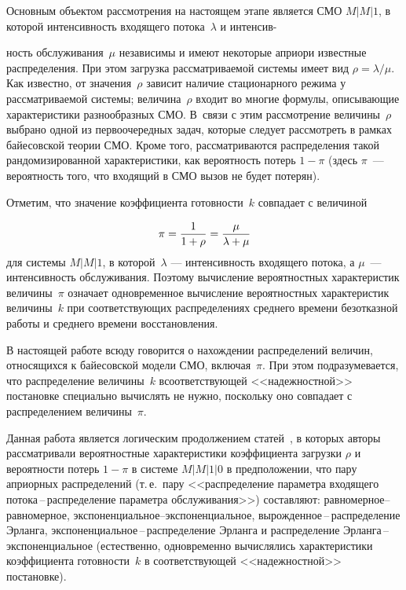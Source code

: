 \begin{multicols}{2}
Основным объектом рассмотрения на настоящем этапе является СМО
$M\vert M\vert 1$, в которой интенсивность входящего
потока~$\lambda$ и интенсив-\linebreak\vspace*{-12pt}
\pagebreak

\noindent
ность обслуживания~$\mu$ независимы и
имеют некоторые априори известные распределения. При этом загрузка
рассматриваемой системы имеет вид $\rho=\lambda/\mu$. Как
известно, от значения~$\rho$ зависит наличие стационарного режима
у рассматриваемой сис\-те\-мы; величина~$\rho$ входит во многие
формулы, описывающие характеристики разнообразных СМО. В~связи с
этим рассмотрение величины~$\rho$ выбрано одной из первоочередных
задач, которые следует рассмотреть в рамках байесовской теории
СМО. Кроме того, рассматриваются распределения такой
рандомизированной характеристики, как вероятность потерь $1-\pi$
(здесь $\pi$~--- вероятность того, что входящий в СМО вызов не
будет потерян).

Отметим, что значение коэффициента го\-тов\-ности~$k$ совпадает с величиной
\vspace*{2pt}

\noindent
$$
\pi=\displaystyle\frac{\displaystyle 1\mathstrut}{\displaystyle 1+\rho\mathstrut}=\displaystyle\frac{\displaystyle \mu\mathstrut}{\displaystyle \lambda+\mu\mathstrut}
$$
для системы $M\vert M\vert 1$, в которой~$\lambda$ --- интенсивность входящего потока, а  
$\mu$~--- интенсивность обслуживания.
Поэтому вычисление вероятностных характеристик величины~$\pi$ означает одновременное вычисление вероятностных
характеристик величины~$k$ при соответствующих распределениях среднего времени безотказной работы и среднего времени
восстановления.

В настоящей работе всюду говорится о на\-хож\-де\-нии распределений величин, относящихся к байесовской модели СМО, 
включая~$\pi$. При этом подразумевается, что распределение величины~$k$ в\linebreak соответствующей <<надежностной>> постановке
специально вычислять не нужно, поскольку оно совпадает с распределением величины~$\pi$.

Данная работа является логическим продолжением статей~\cite{1kud, 2kud, 4kud}, в которых авторы рас\-смат\-ри\-ва\-ли вероятностные
характеристики коэффициента загрузки $\rho$ и вероятности потерь $1-\pi$ в\linebreak
сис\-теме $M\vert M\vert 1\vert 0$ в предположении, что пару\linebreak
априорных распределений (т.\,е.\ пару <<распределение параметра входящего по\-то\-ка\,--\,рас\-пре\-де\-ле\-ние 
па\-ра\-мет\-ра
обслуживания>>) составляют:  рав\-но\-мер\-ное--рав\-но\-мер\-ное, 
экспо\-нен\-ци\-аль\-ное--экс\-по\-нен\-ци\-аль\-ное, вы\-рож\-ден\-ное\,--\,распределение 
Эрланга, экс\-по\-нен\-ци\-аль\-ное\,--\,рас\-пре\-де\-ле\-ние Эрланга и распределение Эрланга\,--\,экспоненциальное 
(естественно, одновременно вычислялись характеристики коэффициента готовности~$k$ в соответствующей
<<надежностной>> постановке).


\end{multicols}
